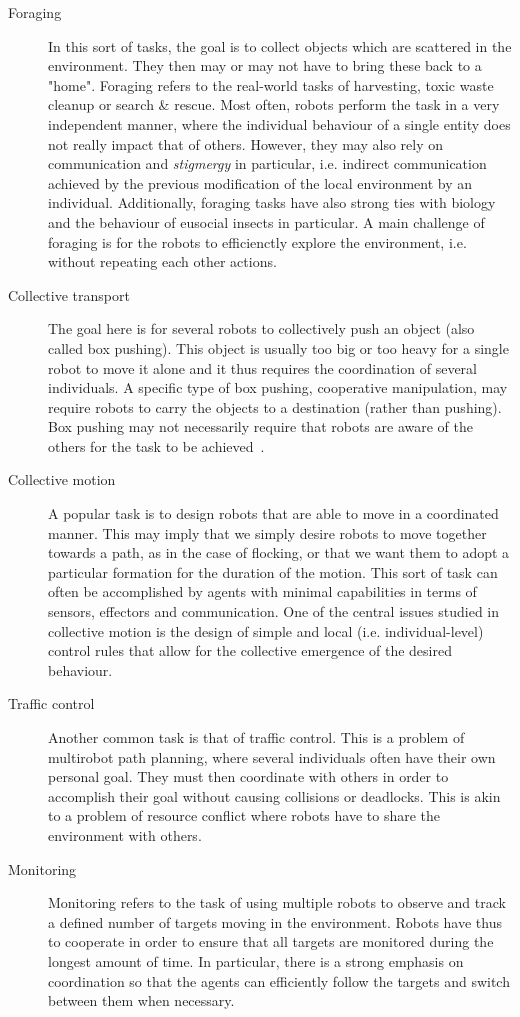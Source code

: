     \begin{description}
      \item[Foraging] {In this sort of tasks, the goal is to collect objects which are scattered in the environment. They then may or may not have to bring these back to a "home". Foraging refers to the real-world tasks of harvesting, toxic waste cleanup or search \& rescue. Most often, robots perform the task in a very independent manner, where the individual behaviour of a single entity does not really impact that of others. However, they may also rely on communication and \emph{stigmergy} in particular, i.e. indirect communication achieved by the previous modification of the local environment by an individual. Additionally, foraging tasks have also strong ties with biology and the behaviour of eusocial insects in particular. A main challenge of foraging is for the robots to efficienctly explore the environment, i.e. without repeating each other actions.}

      \item[Collective transport] {The goal here is for several robots to collectively push an object (also called box pushing). This object is usually too big or too heavy for a single robot to move it alone and it thus requires the coordination of several individuals. A specific type of box pushing, cooperative manipulation, may require robots to carry the objects to a destination (rather than pushing). Box pushing may not necessarily require that robots are aware of the others for the task to be achieved~\parencite{Sen1994}.}

      \item[Collective motion] {A popular task is to design robots that are able to move in a coordinated manner. This may imply that we simply desire robots to move together towards a path, as in the case of flocking, or that we want them to adopt a particular formation for the duration of the motion. This sort of task can often be accomplished by agents with minimal capabilities in terms of sensors, effectors and communication. One of the central issues studied in collective motion is the design of simple and local (i.e. individual-level) control rules that allow for the collective emergence of the desired behaviour.}

      \item[Traffic control] {Another common task is that of traffic control. This is a problem of multirobot path planning, where several individuals often have their own personal goal. They must then coordinate with others in order to accomplish their goal without causing collisions or deadlocks. This is akin to a problem of resource conflict where robots have to share the environment with others.}

      \item[Monitoring] {Monitoring refers to the task of using multiple robots to observe and track a defined number of targets moving in the environment. Robots have thus to cooperate in order to ensure that all targets are monitored during the longest amount of time. In particular, there is a strong emphasis on coordination so that the agents can efficiently follow the targets and switch between them when necessary.}
    \end{description}

